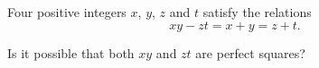 Four positive integers $x$, $y$, $z$ and $t$ satisfy the relations
\[ xy - zt = x + y = z + t. \]

Is it possible that both $xy$ and $zt$ are perfect squares?
